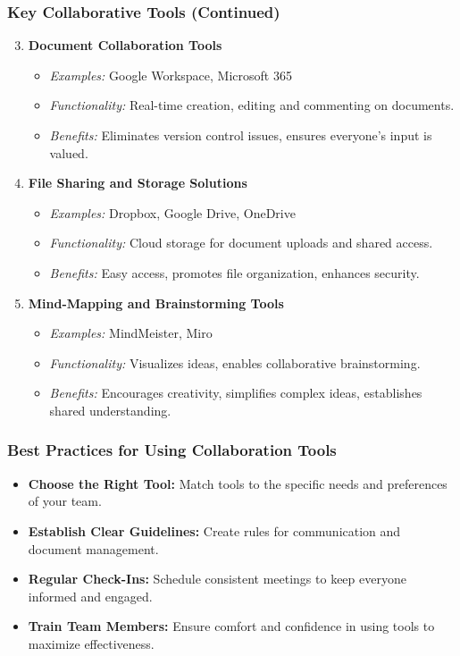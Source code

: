 \documentclass[aspectratio=169]{beamer}
\begin{document}
\begin{frame}[fragile]
    \frametitle{Key Collaborative Tools (Continued)}
    \begin{enumerate}
        \setcounter{enumi}{2} %
        \item \textbf{Document Collaboration Tools}
            \begin{itemize}
                \item \textit{Examples:} Google Workspace, Microsoft 365
                \item \textit{Functionality:} Real-time creation, editing and commenting on documents.
                \item \textit{Benefits:} Eliminates version control issues, ensures everyone's input is valued.
            \end{itemize}

        \item \textbf{File Sharing and Storage Solutions}
            \begin{itemize}
                \item \textit{Examples:} Dropbox, Google Drive, OneDrive
                \item \textit{Functionality:} Cloud storage for document uploads and shared access.
                \item \textit{Benefits:} Easy access, promotes file organization, enhances security.
            \end{itemize}

        \item \textbf{Mind-Mapping and Brainstorming Tools}
            \begin{itemize}
                \item \textit{Examples:} MindMeister, Miro
                \item \textit{Functionality:} Visualizes ideas, enables collaborative brainstorming.
                \item \textit{Benefits:} Encourages creativity, simplifies complex ideas, establishes shared understanding.
            \end{itemize}
    \end{enumerate}
\end{frame}

\begin{frame}[fragile]
    \frametitle{Best Practices for Using Collaboration Tools}
    \begin{itemize}
        \item \textbf{Choose the Right Tool:} Match tools to the specific needs and preferences of your team.
        \item \textbf{Establish Clear Guidelines:} Create rules for communication and document management.
        \item \textbf{Regular Check-Ins:} Schedule consistent meetings to keep everyone informed and engaged.
        \item \textbf{Train Team Members:} Ensure comfort and confidence in using tools to maximize effectiveness.
    \end{itemize}
\end{frame}
\end{document}
